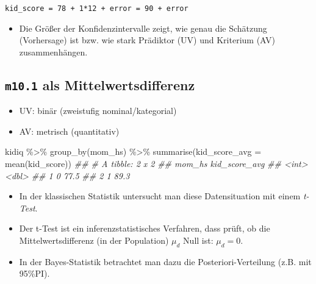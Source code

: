 \documentclass[
  a4paper,
  DIV=11]{scrreprt}
\newenvironment{Shaded}{\begin{snugshade}}{\end{snugshade}}
\newcommand{\AttributeTok}[1]{\textcolor[rgb]{0.40,0.45,0.13}{#1}}
\newcommand{\DocumentationTok}[1]{\textcolor[rgb]{0.37,0.37,0.37}{\textit{#1}}}
\newcommand{\FunctionTok}[1]{\textcolor[rgb]{0.28,0.35,0.67}{#1}}
\newcommand{\NormalTok}[1]{\textcolor[rgb]{0.00,0.23,0.31}{#1}}
\newcommand{\SpecialCharTok}[1]{\textcolor[rgb]{0.37,0.37,0.37}{#1}}
\providecommand{\tightlist}{%
  \setlength{\itemsep}{0pt}\setlength{\parskip}{0pt}}\usepackage{longtable,booktabs,array}
\theoremstyle{definition}
\theoremstyle{remark}
\begin{document}
\texttt{kid\_score\ =\ 78\ +\ 1*12\ +\ error\ =\ 90\ +\ error}

\begin{itemize}
\tightlist
\item
  Die Größer der Konfidenzintervalle zeigt, wie genau die Schätzung
  (Vorhersage) ist bzw. wie stark Prädiktor (UV) und Kriterium (AV)
  zusammenhängen.
\end{itemize}

\hypertarget{m10.1-als-mittelwertsdifferenz}{%
\subsection{\texorpdfstring{\texttt{m10.1} als
Mittelwertsdifferenz}{m10.1 als Mittelwertsdifferenz}}\label{m10.1-als-mittelwertsdifferenz}}

\begin{itemize}
\tightlist
\item
  UV: binär (zweistufig nominal/kategorial)
\item
  AV: metrisch (quantitativ)
\end{itemize}

\begin{Shaded}
\begin{Highlighting}[]
\NormalTok{kidiq }\SpecialCharTok{\%\textgreater{}\%} 
  \FunctionTok{group\_by}\NormalTok{(mom\_hs) }\SpecialCharTok{\%\textgreater{}\%} 
  \FunctionTok{summarise}\NormalTok{(}\AttributeTok{kid\_score\_avg =} 
              \FunctionTok{mean}\NormalTok{(kid\_score))}
\DocumentationTok{\#\# \# A tibble: 2 x 2}
\DocumentationTok{\#\#   mom\_hs kid\_score\_avg}
\DocumentationTok{\#\#    \textless{}int\textgreater{}         \textless{}dbl\textgreater{}}
\DocumentationTok{\#\# 1      0          77.5}
\DocumentationTok{\#\# 2      1          89.3}
\end{Highlighting}
\end{Shaded}

\begin{itemize}
\tightlist
\item
  In der klassischen Statistik untersucht man diese Datensituation mit
  einem \emph{t-Test}.
\item
  Der t-Test ist ein inferenzstatistisches Verfahren, dass prüft, ob die
  Mittelwertsdifferenz (in der Population) \(\mu_d\) Null ist:
  \(\mu_d = 0\).
\item
  In der Bayes-Statistik betrachtet man dazu die Posteriori-Verteilung
  (z.B. mit 95\%PI).
\end{itemize}
\end{document}
